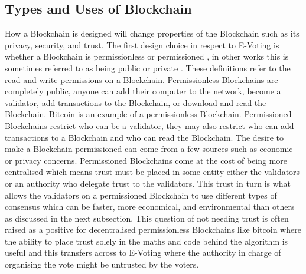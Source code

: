 \documentclass{entcs}
\begin{document}
\subsection{Types and Uses of Blockchain}
How a Blockchain is designed will change properties of the Blockchain such as its privacy, security, and trust. The first design choice in respect to E-Voting is whether a Blockchain is permissionless or permissioned \cite{wust2018need}, in other works this is sometimes referred to as being public or private \cite{blockchainBeginners}. These definitions refer to the read and write permissions on a Blockchain. 
Permissionless Blockchains are completely public, anyone can add their computer to the network, become a validator, add transactions to the Blockchain, or download and read the Blockchain. Bitcoin is an example of a permissionless Blockchain.
Permissioned Blockchains restrict who can be a validator, they may also restrict who can add transactions to a Blockchain and who can read the Blockchain. The desire to make a Blockchain permissioned can come from a few sources such as economic or privacy concerns. Permissioned Blockchains come at the cost of being more centralised which means trust must be placed in some entity either the validators or an authority who delegate trust to the validators. This trust in turn is what allows the validators on a permissioned Blockchain to use different types of consensus which can be faster, more economical, and environmental than others as discussed in the next subsection.
This question of not needing trust \cite{lemieux2016trusting} is often raised as a positive for decentralised permissionless Blockchains like bitcoin where the ability to place trust solely in the maths and code behind the algorithm is useful and this transfers across to E-Voting where the authority in charge of organising the vote might be untrusted by the voters.

\end{document}
